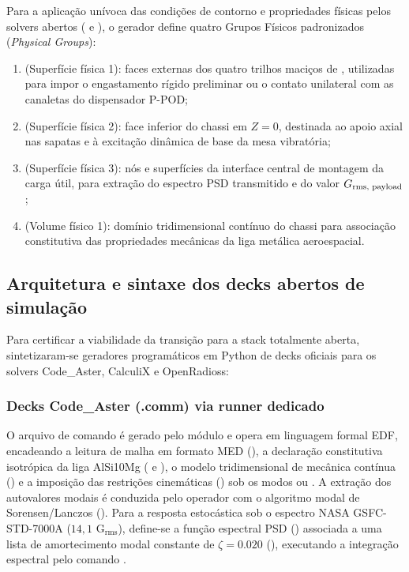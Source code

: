 Para a aplicação unívoca das condições de contorno e propriedades físicas pelos solvers abertos ( e ), o gerador define quatro Grupos Físicos padronizados (\textit{Physical Groups}):
\begin{enumerate}
  \item {} (Superfície física 1): faces externas dos quatro trilhos maciços de \rail{}, utilizadas para impor o engastamento rígido preliminar ou o contato unilateral com as canaletas do dispensador P-POD;
  \item {} (Superfície física 2): face inferior do chassi em $Z = 0$, destinada ao apoio axial nas sapatas e à excitação dinâmica de base da mesa vibratória;
  \item {} (Superfície física 3): nós e superfícies da interface central de montagem da carga útil, para extração do espectro PSD transmitido e do valor $G_{\text{rms, payload}}$;
  \item {} (Volume físico 1): domínio tridimensional contínuo do chassi para associação constitutiva das propriedades mecânicas da liga metálica aeroespacial.
\end{enumerate}

\subsection{Arquitetura e sintaxe dos decks abertos de simulação}
\label{subsec:decks-abertos}

Para certificar a viabilidade da transição para a stack totalmente aberta, sintetizaram-se geradores programáticos em Python de decks oficiais para os solvers Code\_Aster, CalculiX e OpenRadioss:

\subsubsection{Decks Code\_Aster (.comm) via runner dedicado}
\label{subsubsec:codeaster}
O arquivo de comando é gerado pelo módulo  e opera em linguagem formal EDF, encadeando a leitura de malha em formato MED (), a declaração constitutiva isotrópica da liga AlSi10Mg ( e ), o modelo tridimensional de mecânica contínua () e a imposição das restrições cinemáticas () sob os modos  ou . A extração dos autovalores modais é conduzida pelo operador  com o algoritmo modal de Sorensen/Lanczos (). Para a resposta estocástica sob o espectro NASA GSFC-STD-7000A ($14{,}1\text{ G}_{\text{rms}}$), define-se a função espectral PSD () associada a uma lista de amortecimento modal constante de $\zeta = \num{0.020}$ (), executando a integração espectral pelo comando .

